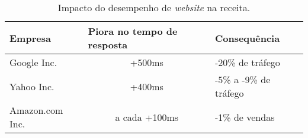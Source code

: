 \begin{table}[h]
	\centering
	\caption{Impacto do desempenho de \textit{website} na receita.\label{tab:impactodesempenho}}
	\begin{tabular}{lcl}
		\hline
			\textbf{Empresa} & \multicolumn{1}{l}{\textbf{Piora no tempo de resposta}} & \textbf{Consequência}  \\
		\hline
			Google Inc.      & +500ms                                                  & -20\% de tráfego       \\
			Yahoo Inc.       & +400ms                                                  & -5\% a -9\% de tráfego \\
			Amazon.com Inc.  & a cada +100ms                                           & -1\% de vendas         \\           
		\hline
	\end{tabular}
\end{table}